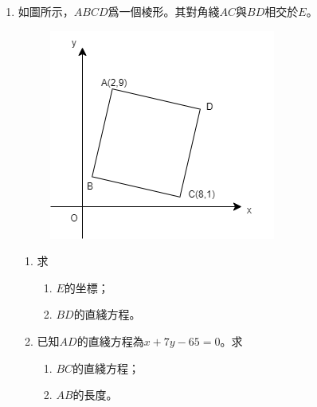 \documentclass[11pt]{article}
\begin{document}
\begin{enumerate}
            \hrulefill
            
            \hrulefill
            
            \hrulefill
            
            \hrulefill
            
            \hrulefill
            
            \hrulefill
            
            \hrulefill
            
            \hrulefill
            
            \hrulefill
            
            \hrulefill
            
            \hrulefill
            
            \hrulefill
            
            \hrulefill

        \pagebreak
        \item 如圖所示，$ABCD$爲一個棱形。其對角綫$AC$與$BD$相交於$E$。\begin{figure}[H]
            \centering
            \includegraphics[scale=0.6]{f4finalq4.png}
        \end{figure}\begin{enumerate}
            \item 求\begin{enumerate}
                \item $E$的坐標；
                \item $BD$的直綫方程。
            \end{enumerate}
            \item 已知$AD$的直綫方程為$x+7y-65=0$。求\begin{enumerate}
                \item $BC$的直綫方程；
                \item $AB$的長度。
            \end{enumerate}
        \end{enumerate}


\end{enumerate}
\end{document}
